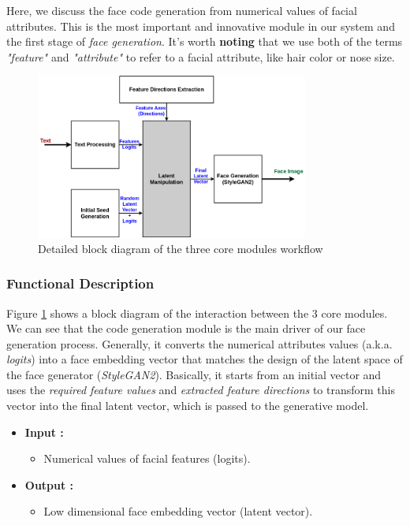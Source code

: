 Here, we discuss the face code generation from numerical values of facial attributes. This is the most important and innovative module in our system and the first stage of \emph{face generation}. It's worth \textbf{noting} that we use both of the terms \emph{"feature"} and \emph{"attribute"} to refer to a facial attribute, like hair color or nose size.

\begin{figure}[H]
    \centering
    \includegraphics[width=0.8\textwidth]{images/face-gen-arch.png}
    \caption{Detailed block diagram of the three core modules workflow}
    \label{fig:face_gen}
\end{figure}

\subsubsection{Functional Description}

Figure \ref{fig:face_gen} shows a block diagram of the interaction between the $3$ core modules. We can see that the code generation module is the main driver of our face generation process. Generally, it converts the numerical attributes values (a.k.a. \emph{logits}) into a face embedding vector that matches the design of the latent space of the face generator (\emph{StyleGAN2}). Basically, it starts from an initial vector and uses the \emph{required feature values} and \emph{extracted feature directions} to transform this vector into the final latent vector, which is passed to the generative model.

\begin{itemize}
    \item \textbf{Input :}
    \begin{itemize}
        \item Numerical values of facial features (logits).
    \end{itemize}
    \item \textbf{Output :}
    \begin{itemize}
        \item Low dimensional face embedding vector (latent vector).
    \end{itemize}
\end{itemize}

